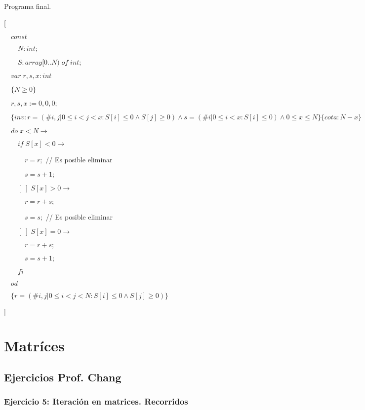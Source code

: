 \documentclass[hidelinks]{article}
\begin{document}
\newpage

Programa final. \par

[\par
$\quad const $\par
$\qquad N: int;$\par
$\qquad S: array[0..N) \; of \; int;$\par
$\quad var \; r, s, x: int$\par
$\quad\{N \geq 0\}$\par
$\quad r, s, x := 0,0,0;$\par
$\quad\{inv: r = (\# i,j| 0\leq i < j < x :S[i] \leq 0 \land S[j] \geq 0) \land s = (\# i| 0\leq i < x :S[i] \leq 0) \land 0 \leq x \leq N\}\{cota: N-x\}$\par
$\quad do \; x < N \rightarrow $ \par
$\qquad if \; S[x] < 0 \rightarrow $ \par
$\qquad \quad r = r; $ // Es posible eliminar \par
$\qquad \quad s = s+1; $ \par
$\qquad [\;] \; S[x] > 0 \rightarrow $ \par
$\qquad \quad r = r+s; $ \par
$\qquad \quad s = s; $ // Es posible eliminar \par
$\qquad [\;] \; S[x] = 0 \rightarrow $ \par
$\qquad \quad r = r+s; $ \par
$\qquad \quad s = s+1; $ \par
$\qquad fi $ \par
$\quad od $ \par
$\quad \{r = (\# i,j| 0\leq i < j < N :S[i] \leq 0 \land S[j] \geq 0)\}$ \par
]

\newpage

\section{Matríces}

\subsection{Ejercicios Prof. Chang}


\subsubsection{Ejercicio 5: Iteración en matrices. Recorridos}
\end{document}
